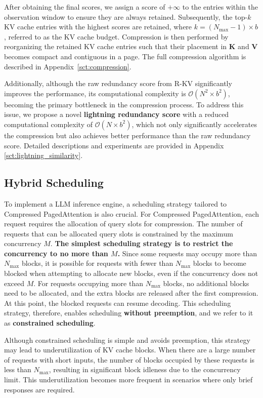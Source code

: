 \documentclass[11pt]{article}
\begin{document}
After obtaining the final scores, we assign a score of $+\infty$ to the entries within the observation window to ensure they are always retained. Subsequently, the top-$k$ KV cache entries with the highest scores are retained, where $k = (N_{\max} - 1) \times b$, referred to as the KV cache budget. Compression is then performed by reorganizing the retained KV cache entries such that their placement in $\mathbf{K}$ and $\mathbf{V}$ becomes compact and contiguous in a page. The full compression algorithm is described in Appendix~\ref{sct:compression}.


Additionally, although the raw redundancy score from R-KV significantly improves the performance, its computational complexity is $\mathcal{O}(N^2 \times b^2)$, becoming the primary bottleneck in the compression process. To address this issue, we propose a novel \textbf{lightning redundancy score} with a reduced computational complexity of $\mathcal{O}(N \times b^2)$, which not only significantly accelerates the compression but also achieves better performance than the raw redundancy score. Detailed descriptions and experiments are provided in Appendix \ref{sct:lightning_similarity}.




\subsection{Hybrid Scheduling}
\label{sct:hybrid}
To implement a LLM inference engine, a scheduling strategy tailored to Compressed PagedAttention is also crucial.
For Compressed PagedAttention, each request requires the allocation of  query slots for compression. The number of requests that can be allocated query slots is constrained by the maximum concurrency $M$. \textbf{The simplest scheduling strategy is to restrict the concurrency to no more than $M$.} Since some requests may occupy more than $N_{\max}$ blocks, it is possible for requests with fewer than $N_{\max}$ blocks to become blocked when attempting to allocate new blocks, even if the concurrency does not exceed $M$. For requests occupying more than $N_{\max}$ blocks, no additional blocks need to be allocated, and the extra blocks are released after the first compression. At this point, the blocked requests can resume decoding. This scheduling strategy, therefore, enables scheduling \textbf{without preemption}, and we refer to it as \textbf{constrained scheduling}.

Although constrained scheduling is simple and avoids preemption, this strategy may lead to underutilization of KV cache blocks. When there are a large number of requests with short inputs, the number of blocks occupied by these requests is less than $N_{\max}$, resulting in significant block idleness due to the concurrency limit. This underutilization becomes more frequent in scenarios where only brief responses are required. 
\end{document}
